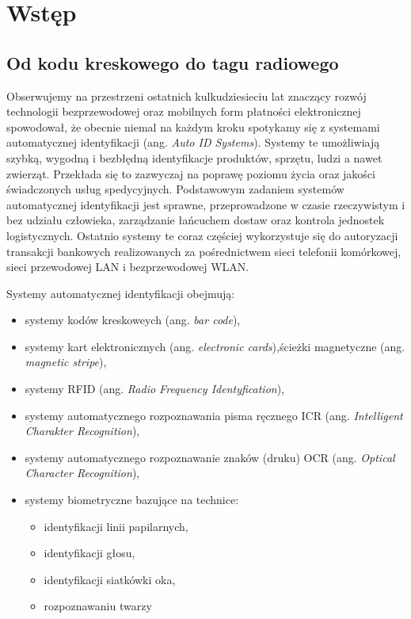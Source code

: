 
\singlespacing
\chapter{Wstęp}

\section{Od kodu kreskowego do tagu radiowego}

Obserwujemy na przestrzeni ostatnich kulkudziesieciu lat znaczący rozwój technologii bezprzewodowej oraz mobilnych form płatności elektronicznej spowodował, że obecnie niemal na każdym kroku spotykamy się z systemami automatycznej identyfikacji (ang. \emph{Auto ID Systems}). Systemy te umożliwiają szybką, wygodną i bezbłędną identyfikacje produktów, sprzętu, ludzi a nawet zwierząt. Przekłada się to zazwyczaj na poprawę poziomu życia oraz jakości świadczonych usług spedycyjnych. Podstawowym zadaniem systemów automatycznej identyfikacji jest sprawne, przeprowadzone w czasie rzeczywistym i bez udziału człowieka, zarządzanie łańcuchem dostaw oraz kontrola jednostek logistycznych. Ostatnio systemy te coraz częściej wykorzystuje się do autoryzacji transakcji bankowych realizowanych za pośrednictwem sieci telefonii komórkowej, sieci przewodowej LAN i bezprzewodowej WLAN.


\noindent 
\newline Systemy automatycznej identyfikacji obejmują:
\begin{itemize}\setlength{\itemsep}{0pt}
    \item systemy kodów kreskoweych (ang. \emph{bar code}),
    \item systemy kart elektronicznych (ang. \emph{electronic cards}),ścieżki magnetyczne (ang. \emph{magnetic stripe}),
    \item systemy RFID (ang. \emph{Radio Frequency Identyfication}),
    \item systemy automatycznego rozpoznawania pisma ręcznego ICR (ang. \emph{Intelligent Charakter Recognition}), 
    \item systemy automatycznego rozpoznawanie znaków (druku) OCR (ang. \emph{Optical Character Recognition}),
    \item systemy biometryczne bazujące na technice:
	\begin{itemize}\setlength{\itemsep}{0pt}
		\item identyfikacji linii papilarnych,
		\item identyfikacji głosu,
		\item identyfikacji siatkówki oka,
		\item rozpoznawaniu twarzy
	\end{itemize}
\end{itemize}

